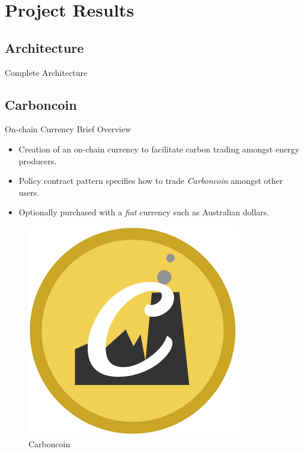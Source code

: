 \section{Project Results}
\subsection{Architecture}
\begin{frame}{Complete Architecture}
    \begin{adjustbox}{max totalsize={1\textwidth}{0.85\textheight},center}
        
    \end{adjustbox}
\end{frame}
\subsection{Carboncoin}
\begin{frame}{On-chain Currency Brief Overview}
    \begin{itemize}
        \item Creation of an on-chain currency to facilitate carbon trading
              amongst energy producers.
        \item Policy contract pattern specifies how to trade \textit{Carboncoin}
              amongst other users.
        \item Optionally purchased with a \textit{fiat} currency such as
              Australian dollars.
    \end{itemize}
    \begin{figure}
        \caption{Carboncoin}
        \centering
        \includegraphics[height=0.2\textheight, width=0.2\linewidth]
        {figures/svg.png}
    \end{figure}
\end{frame}
